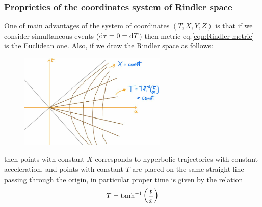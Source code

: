 \documentclass[../main/main.tex]{subfiles}
\begin{document}
\subsubsection{Proprieties of the coordinates system of Rindler space}

One of main advantages of the system of coordinates $(T,X,Y,Z)$ is that if we consider simultaneous events ($\textup{d}\tau=0=\textup{d} T$) then metric eq.\eqref{eqn:Rindler-metric} is the Euclidean one. Also, if we draw the Rindler space as follows:
\begin{figure}[H]
\centering
\includegraphics[width=7cm]{../img/rindler-space2.jpg}
\end{figure}
\noindent then points with constant $X$ corresponds to hyperbolic trajectories with constant acceleration, and points with constant $T$ are placed on the same straight line passing through the origin, in particular proper time is given by the relation
\[T=\tanh^{-1}\left(\frac tx\right)\]
\end{document}
